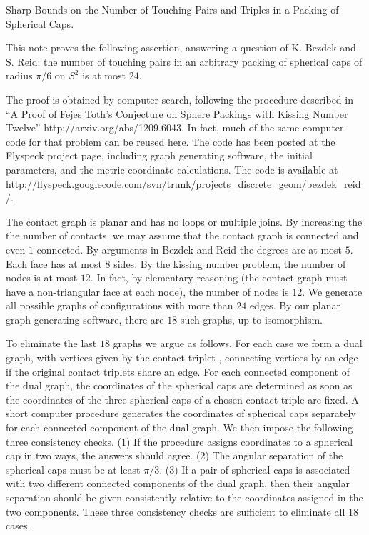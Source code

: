 Sharp Bounds on the Number of Touching Pairs and Triples in a
Packing of Spherical Caps.



This note proves the following assertion, answering a question of
K. Bezdek and S. Reid: the number of touching pairs in an arbitrary
packing of spherical caps of radius $\pi/6$ on $S^2$ is at most $24$.

The proof is obtained by computer search, following the procedure
described in ``A Proof of Fejes Toth's Conjecture on Sphere Packings
with Kissing Number Twelve'' http://arxiv.org/abs/1209.6043.  In fact,
much of the same computer code for that problem can be reused here.
The code has been posted at the Flyspeck project page, including graph
generating software, the initial parameters, and the metric coordinate
calculations.  The code is available at
http://flyspeck.googlecode.com/svn/trunk/projects_discrete_geom/bezdek_reid/.

The contact graph is planar and has no loops or multiple joins.  By
increasing the the number of contacts, we may assume that the contact
graph is connected and even $1$-connected.  By arguments in Bezdek and
Reid the degrees are at most $5$.  Each face has at most $8$ sides.
By the kissing number problem, the number of nodes is at most $12$.
In fact, by elementary reasoning (the contact graph must have a
non-triangular face at each node), the number of nodes is $12$.  We
generate all possible graphs of configurations with more than $24$
edges.  By our planar graph generating software, there are $18$ such
graphs, up to isomorphism.

To eliminate the last $18$ graphs we argue as follows. For each case
we form a dual graph, with vertices given by the contact triplet ,
connecting vertices by an edge if the original contact triplets share
an edge.  For each connected component of the dual graph, the
coordinates of the spherical caps are determined as soon as the
coordinates of the three spherical caps of a chosen contact triple are
fixed.  A short computer procedure generates the coordinates of
spherical caps separately for each connected component of the dual
graph.  We then impose the following three consistency checks. (1) If
the procedure assigns coordinates to a spherical cap in two ways, the
answers should agree. (2) The angular separation of the spherical caps
must be at least $\pi/3$.  (3) If a pair of spherical caps is
associated with two different connected components of the dual graph,
then their angular separation should be given consistently relative to
the coordinates assigned in the two components.  These three
consistency checks are sufficient to eliminate all $18$ cases.

